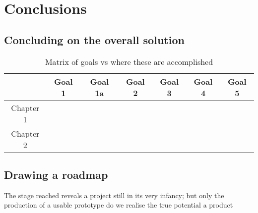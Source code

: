 \chapter{Conclusions}


\section{Concluding on the overall solution}


\begin{table}[h!]
\centering
\begin{tabular}{|c|c|c|c|c|c|c|}
	\hline 
	& Goal 1 & Goal 1a & Goal 2 & Goal 3 & Goal 4 & Goal 5 \\ 
	\hline 
	Chapter 1 &  &  &  &  &  &  \\ 
	\hline 
	Chapter 2 &  &  &  &  &  &  \\ 
	\hline 
\end{tabular} 
\caption{Matrix of goals vs where these are accomplished}
\end{table}





\section{Drawing a roadmap}


The stage reached reveals a project still in its very infancy; but only the production of a usable prototype do we realise the true potential a product 

